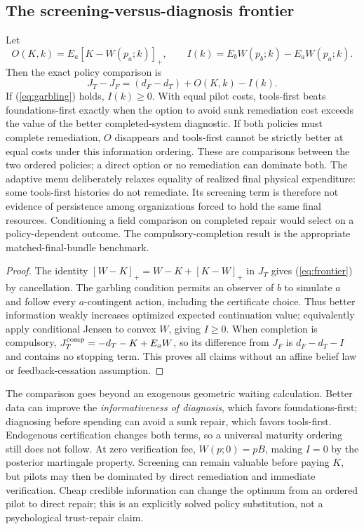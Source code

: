 \subsection{The screening-versus-diagnosis frontier}
\begin{proposition}\label{prop:frontier}
Let
\begin{equation}
 O(K,k)=E_a[K-W(p_a;k)]_+,
 \qquad I(k)=E_bW(p_b;k)-E_aW(p_a;k).
\end{equation}
Then the exact policy comparison is
\begin{equation}
 J_T-J_F=(d_F-d_T)+O(K,k)-I(k).\label{eq:frontier}
\end{equation}
If (\ref{eq:garbling}) holds, $I(k)\geq0$. With equal pilot costs, tools-first beats foundations-first exactly when the option to avoid sunk remediation cost exceeds the value of the better completed-system diagnostic. If both policies must complete remediation, $O$ disappears and tools-first cannot be strictly better at equal costs under this information ordering. These are comparisons between the two ordered policies; a direct option or no remediation can dominate both. The adaptive menu deliberately relaxes equality of realized final physical expenditure: some tools-first histories do not remediate. Its screening term is therefore not evidence of persistence among organizations forced to hold the same final resources. Conditioning a field comparison on completed repair would select on a policy-dependent outcome. The compulsory-completion result is the appropriate matched-final-bundle benchmark.
\end{proposition}
\begin{proof}
The identity $[W-K]_+=W-K+[K-W]_+$ in $J_T$ gives (\ref{eq:frontier}) by cancellation. The garbling condition permits an observer of $b$ to simulate $a$ and follow every $a$-contingent action, including the certificate choice. Thus better information weakly increases optimized expected continuation value; equivalently apply conditional Jensen to convex $W$, giving $I\geq0$. When completion is compulsory, $J_T^{\rm comp}=-d_T-K+E_aW$, so its difference from $J_F$ is $d_F-d_T-I$ and contains no stopping term. This proves all claims without an affine belief law or feedback-cessation assumption.
\end{proof}
The comparison goes beyond an exogenous geometric waiting calculation. Better data can improve the \emph{informativeness of diagnosis}, which favors foundations-first; diagnosing before spending can avoid a sunk repair, which favors tools-first. Endogenous certification changes both terms, so a universal maturity ordering still does not follow. At zero verification fee, $W(p;0)=pB$, making $I=0$ by the posterior martingale property. Screening can remain valuable before paying $K$, but pilots may then be dominated by direct remediation and immediate verification. Cheap credible information can change the optimum from an ordered pilot to direct repair; this is an explicitly solved policy substitution, not a psychological trust-repair claim.


